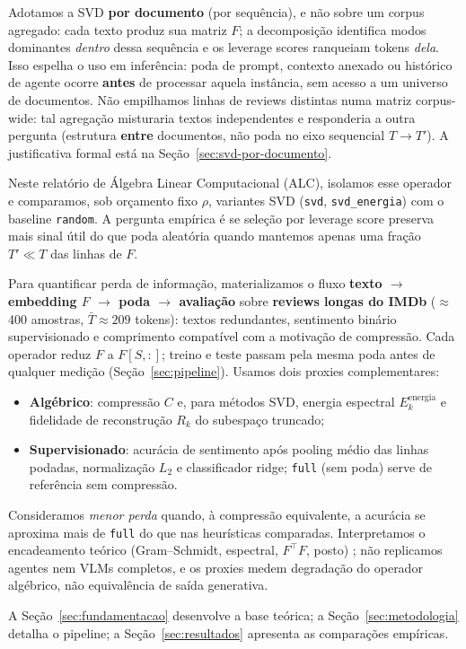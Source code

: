 Adotamos a SVD \textbf{por documento} (por sequência), e não sobre um corpus agregado: cada texto produz sua matriz $F$; a decomposição identifica modos dominantes \emph{dentro} dessa sequência e os leverage scores ranqueiam tokens \emph{dela}. Isso espelha o uso em inferência: poda de prompt, contexto anexado ou histórico de agente ocorre \textbf{antes} de processar aquela instância, sem acesso a um universo de documentos. Não empilhamos linhas de reviews distintas numa matriz corpus-wide: tal agregação misturaria textos independentes e responderia a outra pergunta (estrutura \textbf{entre} documentos, não poda no eixo sequencial $T \to T'$). A justificativa formal está na Seção~\ref{sec:svd-por-documento}.

Neste relatório de Álgebra Linear Computacional (ALC), isolamos esse operador e comparamos, sob orçamento fixo $\rho$, variantes SVD (\texttt{svd}, \texttt{svd\_energia}) com o baseline \texttt{random}. A pergunta empírica é se seleção por leverage score preserva mais sinal útil do que poda aleatória quando mantemos apenas uma fração $T' \ll T$ das linhas de $F$.

Para quantificar perda de informação, materializamos o fluxo \textbf{texto $\to$ embedding $F$ $\to$ poda $\to$ avaliação} sobre \textbf{reviews longas do IMDb} ($\approx$400 amostras, $\bar{T}\approx 209$ tokens): textos redundantes, sentimento binário supervisionado e comprimento compatível com a motivação de compressão. Cada operador reduz $F$ a $F[S,:]$; treino e teste passam pela mesma poda antes de qualquer medição (Seção~\ref{sec:pipeline}). Usamos dois proxies complementares:
\begin{itemize}
    \item \textbf{Algébrico}: compressão $C$ e, para métodos SVD, energia espectral $E_k^{\mathrm{energia}}$ e fidelidade de reconstrução $R_k$ do subespaço truncado;
    \item \textbf{Supervisionado}: acurácia de sentimento após pooling médio das linhas podadas, normalização $L_2$ e classificador ridge; \texttt{full} (sem poda) serve de referência sem compressão.
\end{itemize}
Consideramos \emph{menor perda} quando, à compressão equivalente, a acurácia se aproxima mais de \texttt{full} do que nas heurísticas comparadas. Interpretamos o encadeamento teórico (Gram--Schmidt, espectral, $F^\top F$, posto) \cite{alc21svd,alc19espectral,alc11base}; não replicamos agentes nem VLMs completos, e os proxies medem degradação do operador algébrico, não equivalência de saída generativa.

A Seção~\ref{sec:fundamentacao} desenvolve a base teórica; a Seção~\ref{sec:metodologia} detalha o pipeline; a Seção~\ref{sec:resultados} apresenta as comparações empíricas.
